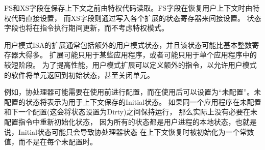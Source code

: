
FS和XS字段在保存上下文之前由特权代码读取。FS字段在恢复用户上下文时由特权代码直接设置，
而XS字段则通过写入各个扩展的状态寄存器来间接设置。
状态字段也将在指令执行期间更新，而不考虑特权模式。


用户模式ISA的扩展通常包括额外的用户模式状态，并且该状态可能比基本整数寄存器大得多。
扩展可能只用于某些应用程序，或者可能只用于单个应用程序中的较短阶段。
为了提高性能，用户模式扩展可以定义额外的指令，以允许用户模式的软件将单元返回到初始状态，甚至关闭单元。


例如，协处理器可能需要在使用前进行配置，而在使用后可以设置为“未配置”。未配置的状态将表示为用于上下文保存的Initial状态。
如果同一个应用程序在未配置和下一个配置(这会将状态设置为Dirty)之间保持运行，
那么实际上没有必要在未配置指令中重新初始化状态，
因为所有的状态都是用户进程的本地状态，也就是说，Initial状态可能只会导致协处理器状态
在上下文恢复时被初始化为一个常数值，而不是在每个未配置时。


